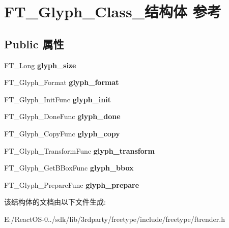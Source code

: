 \hypertarget{struct_f_t___glyph___class__}{}\section{F\+T\+\_\+\+Glyph\+\_\+\+Class\+\_\+结构体 参考}
\label{struct_f_t___glyph___class__}
\subsection*{Public 属性}
\begin{DoxyCompactItemize}
\item 
\mbox{\label{struct_f_t___glyph___class___a1a76c68b9fb0e93947e888c0fe77cbf8}} 
F\+T\+\_\+\+Long {\bfseries glyph\+\_\+size}
\item 
\mbox{\label{struct_f_t___glyph___class___a26738bd14d5845e18d09ccaa3a709d23}} 
F\+T\+\_\+\+Glyph\+\_\+\+Format {\bfseries glyph\+\_\+format}
\item 
\mbox{\label{struct_f_t___glyph___class___a657200ad15ff061b38fb25b168737f95}} 
F\+T\+\_\+\+Glyph\+\_\+\+Init\+Func {\bfseries glyph\+\_\+init}
\item 
\mbox{\label{struct_f_t___glyph___class___aabf05a4368dccacf45e1a54e542e5d63}} 
F\+T\+\_\+\+Glyph\+\_\+\+Done\+Func {\bfseries glyph\+\_\+done}
\item 
\mbox{\label{struct_f_t___glyph___class___afc78dcdc4802760ebcaccf3a7b6cd088}} 
F\+T\+\_\+\+Glyph\+\_\+\+Copy\+Func {\bfseries glyph\+\_\+copy}
\item 
\mbox{\label{struct_f_t___glyph___class___a5f72ac1d0d92eb31fa3e2bb721a97ef2}} 
F\+T\+\_\+\+Glyph\+\_\+\+Transform\+Func {\bfseries glyph\+\_\+transform}
\item 
\mbox{\label{struct_f_t___glyph___class___a06bfad431865c6731305cb781f78b317}} 
F\+T\+\_\+\+Glyph\+\_\+\+Get\+B\+Box\+Func {\bfseries glyph\+\_\+bbox}
\item 
\mbox{\label{struct_f_t___glyph___class___af7f406e5ea20a6614c946746938830c9}} 
F\+T\+\_\+\+Glyph\+\_\+\+Prepare\+Func {\bfseries glyph\+\_\+prepare}
\end{DoxyCompactItemize}


该结构体的文档由以下文件生成\+:\begin{DoxyCompactItemize}
\item 
E\+:/\+React\+O\+S-\/0../sdk/lib/3rdparty/freetype/include/freetype/ftrender.\+h\end{DoxyCompactItemize}
